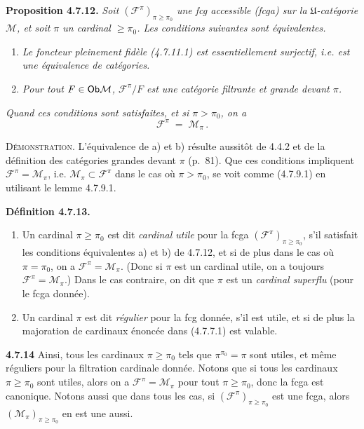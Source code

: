 \textbf{Proposition 4.7.12.} \textit{Soit $(\mathcal{F}^{\pi})_{\pi\geqslant\pi_0}$ une fcg accessible (fcga) sur la $\mathfrak{U}$-catégorie $\mathcal{M}$, et soit $\pi$ un cardinal $\geqslant\pi_0$. Les conditions suivantes sont équivalentes.}
\begin{enumerate}[label=\textit{\alph*)}]
\item \textit{Le foncteur pleinement fidèle (4.7.11.1) est essentiellement surjectif, i.e. est une équivalence de catégories.}
\item \textit{Pour tout $F\in\mathsf{Ob}\mathcal{M}$, $\mathcal{F}^{\pi}/F$ est une catégorie filtrante et grande devant $\pi$.}
\end{enumerate}

\noindent{}
\textit{Quand ces conditions sont satisfaites, et si $\pi>\pi_0$, on a}
\[
\mathcal{F}^{\pi} \;=\; \mathcal{M}_\pi \, . \tag*{(4.7.12.1)}
\]

\textsc{Démonstration}. L'équivalence de a) et b) résulte aussitôt de 4.4.2 et de la définition des catégories grandes devant $\pi$ (p.~81). Que ces
conditions impliquent $\mathcal{F}^{\pi}=\mathcal{M}_\pi$, i.e. $\mathcal{M}_\pi\subset\mathcal{F}^{\pi}$ dans le cas où $\pi>\pi_0$, se voit comme (4.7.9.1) en utilisant le lemme 4.7.9.1.

\textbf{Définition 4.7.13.}
\begin{enumerate}[label={$\arabic*^{\circ}$)}]
\item Un cardinal $\pi\geqslant\pi_0$ est dit \textit{cardinal utile} pour la fcga $(\mathcal{F}^{\pi})_{\pi\geqslant\pi_0}$, s'il satisfait les conditions équivalentes a) et b) de 4.7.12, et si de plus dans le cas où $\pi=\pi_0$, on a $\mathcal{F}^{\pi}=\mathcal{M}_\pi$. (Donc si $\pi$ est un cardinal utile, on a toujours $\mathcal{F}^{\pi}=\mathcal{M}_\pi$.) Dans le cas contraire, on dit que $\pi$ est un \textit{cardinal superflu} (pour le fcga donnée). %
\item Un cardinal $\pi$ est dit \textit{régulier} pour la fcg donnée, s'il est utile, et si de plus la majoration de cardinaux énoncée dans (4.7.7.1) est valable.
\end{enumerate}

\textbf{4.7.14} Ainsi, tous les cardinaux $\pi\geqslant\pi_0$ tels que $\pi^{\pi_0}=\pi$ sont utiles, et même réguliers pour la filtration cardinale donnée. Notons que si tous les cardinaux $\pi\geqslant\pi_0$ sont utiles, alors on a $\mathcal{F}^{\pi}=\mathcal{M}_\pi$ pour tout $\pi\geqslant\pi_0$, donc la fcga est canonique. Notons aussi que dans tous les cas, si $(\mathcal{F}^{\pi})_{\pi\geqslant\pi_0}$ est une fcga, alors $(\mathcal{M}_\pi)_{\pi\geqslant\pi_0}$ en est une aussi.

